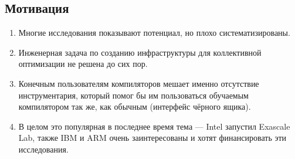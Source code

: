 \subsection{Мотивация}
\begin{enumerate}
\item Многие исследования показывают потенциал, но плохо систематизированы.
\item Инженерная задача по созданию инфраструктуры для коллективной оптимизации не решена до сих пор.
\item Конечным пользователям компиляторов мешает именно отсутствие инструментария, который помог бы им пользоваться обучаемым компилятором так же, как обычным (интерфейс чёрного ящика).
\item В целом это популярная в последнее время тема --- Intel запустил Exascale Lab, также IBM и ARM очень заинтересованы и хотят финансировать эти исследования.
\end{enumerate}
